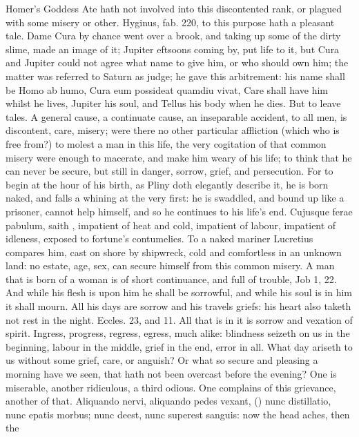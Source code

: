 {Homer's Goddess Ate hath not involved into this discontented
rank, or plagued with some misery or other. Hyginus, fab. 220, to
this purpose hath a pleasant tale. Dame Cura by chance went over a
brook, and taking up some of the dirty slime, made an image of it;
Jupiter eftsoons coming by, put life to it, but Cura and Jupiter could
not agree what name to give him, or who should own him; the matter was
referred to Saturn as judge; he gave this arbitrement: his name shall
be Homo ab humo, Cura eum possideat quamdiu vivat, Care shall have him
whilst he lives, Jupiter his soul, and Tellus his body when he dies.
But to leave tales. A general cause, a continuate cause, an inseparable
accident, to all men, is discontent, care, misery; were there no other
particular affliction (which who is free from?) to molest a man in this
life, the very cogitation of that common misery were enough to
macerate, and make him weary of his life; to think that he can never be
secure, but still in danger, sorrow, grief, and persecution. For to
begin at the hour of his birth, as Pliny doth elegantly describe
it, he is born naked, and falls a whining at the very first: he
is swaddled, and bound up like a prisoner, cannot help himself, and so
he continues to his life's end. Cujusque ferae pabulum, saith
\Seneca, impatient of heat and cold, impatient of labour,
impatient of idleness, exposed to fortune's contumelies. To a naked
mariner Lucretius compares him, cast on shore by shipwreck, cold and
comfortless in an unknown land: no estate, age, sex, can secure
himself from this common misery. A man that is born of a woman is of
short continuance, and full of trouble, Job  1, 22. And while his
flesh is upon him he shall be sorrowful, and while his soul is in him
it shall mourn. All his days are sorrow and his travels griefs: his
heart also taketh not rest in the night. Eccles.  23, and  11.
All that is in it is sorrow and vexation of spirit. Ingress,
progress, regress, egress, much alike: blindness seizeth on us in the
beginning, labour in the middle, grief in the end, error in all. What
day ariseth to us without some grief, care, or anguish? Or what so
secure and pleasing a morning have we seen, that hath not been overcast
before the evening? One is miserable, another ridiculous, a third
odious. One complains of this grievance, another of that. Aliquando
nervi, aliquando pedes vexant, (\Seneca) nunc distillatio, nunc epatis
morbus; nunc deest, nunc superest sanguis: now the head aches, then the
}
